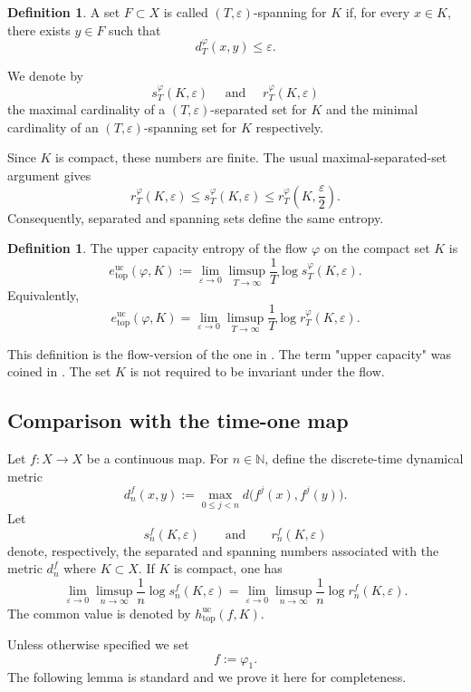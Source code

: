 \documentclass[11pt,reqno]{amsart}
\theoremstyle{definition}
\newtheorem{definition}[theorem]{Definition}
\theoremstyle{remark}
\newcommand{\huc}{h^{\mathrm{uc}}_{\mathrm{top}}}
\newcommand{\hE}{e^{\mathrm{uc}}_{\mathrm{top}}}
\begin{document}
\begin{definition}
A set $F\subset X$ is called $(T,\varepsilon)$-spanning for $K$ if,
for every $x\in K$, there exists $y\in F$ such that
\[
d_T^\varphi(x,y)\leq\varepsilon.
\]
\end{definition}

We denote by
\[
s_T^\varphi(K,\varepsilon)\quad\mbox{ and }\quad r_T^\varphi(K,\varepsilon)
\]
the maximal cardinality of a $(T,\varepsilon)$-separated set for
$K$ and
the minimal cardinality of an $(T,\varepsilon)$-spanning set for $K$ respectively.

Since $K$ is compact, these numbers are finite.
The usual maximal-separated-set argument gives
\[
r_T^\varphi(K,\varepsilon)
\leq
s_T^\varphi(K,\varepsilon)
\leq
r_T^\varphi\left(K,\frac{\varepsilon}{2}\right).
\]
Consequently, separated and spanning sets define the same entropy.

\begin{definition}
\label{UC}
The upper capacity entropy of the flow $\varphi$ on the compact set
$K$ is
\[
\hE(\varphi,K)
:=
\lim_{\varepsilon\to0}
\limsup_{T\to\infty}
\frac1T\log s_T^\varphi(K,\varepsilon).
\]
Equivalently,
\[
\hE(\varphi,K)
=
\lim_{\varepsilon\to0}
\limsup_{T\to\infty}
\frac1T\log r_T^\varphi(K,\varepsilon).
\]
\end{definition}

This definition is the flow-version of the one in \cite{b1}.
The term "upper capacity" was coined in \cite{fh}.
The set $K$ is not required to be invariant under the flow.




\subsection{Comparison with the time-one map}

Let $f:X\to X$ be a continuous map.
For $n\in\mathbb{N}$, define the discrete-time dynamical metric
\[
d_n^f(x,y)
:=
\max_{0\leq j<n}
d\bigl(f^j(x),f^j(y)\bigr).
\]
Let
\[
s_n^f(K,\varepsilon)
\qquad\text{and}\qquad
r_n^f(K,\varepsilon)
\]
denote, respectively, the separated and spanning numbers associated
with the metric $d_n^f$ where $K\subset X$.
If $K$ is compact, one has
$$
\lim_{\varepsilon\to0}\limsup_{n\to\infty}\frac{1}n\log s_n^f(K,\varepsilon)=\lim_{\varepsilon\to0}\limsup_{n\to\infty}\frac{1}n\log r_n^f(K,\varepsilon).
$$
The common value is denoted by $\huc(f,K)$.

Unless otherwise specified we set
\[
f:=\varphi_1.
\]
The following lemma is standard and we prove it here for completeness.
\end{document}
